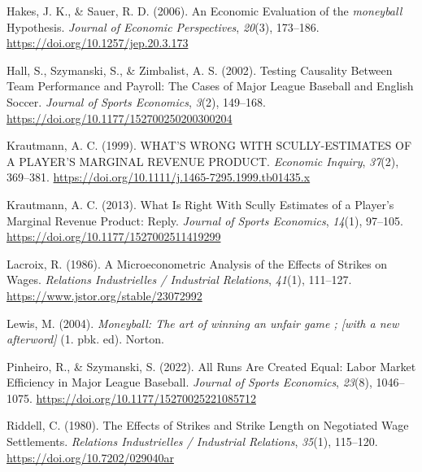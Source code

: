 \documentclass[
  12pt,
  letterpaper,
  DIV=11,
  numbers=noendperiod]{scrartcl}
\newlength{\cslhangindent}
\newlength{\cslentryspacingunit} %
\newenvironment{CSLReferences}[2] %
 {%
  \setlength{\parindent}{0pt}
  \ifodd #1
  \let\oldpar\par
  \def\par{\hangindent=\cslhangindent\oldpar}
  \fi
  \setlength{\parskip}{#2\cslentryspacingunit}
 }%
 {}
\begin{document}
\begin{CSLReferences}{1}{0}
\leavevmode{}%
Hakes, J. K., \& Sauer, R. D. (2006). An {Economic} {Evaluation} of the
\emph{moneyball} {Hypothesis}. \emph{Journal of Economic Perspectives},
\emph{20}(3), 173--186. \url{https://doi.org/10.1257/jep.20.3.173}

\leavevmode{}%
Hall, S., Szymanski, S., \& Zimbalist, A. S. (2002). Testing {Causality}
{Between} {Team} {Performance} and {Payroll}: {The} {Cases} of {Major}
{League} {Baseball} and {English} {Soccer}. \emph{Journal of Sports
Economics}, \emph{3}(2), 149--168.
\url{https://doi.org/10.1177/152700250200300204}

\leavevmode{}%
Krautmann, A. C. (1999). {WHAT}'{S} {WRONG} {WITH} {SCULLY}-{ESTIMATES}
{OF} {A} {PLAYER}'{S} {MARGINAL} {REVENUE} {PRODUCT}. \emph{Economic
Inquiry}, \emph{37}(2), 369--381.
\url{https://doi.org/10.1111/j.1465-7295.1999.tb01435.x}

\leavevmode{}%
Krautmann, A. C. (2013). What {Is} {Right} {With} {Scully} {Estimates}
of a {Player}'s {Marginal} {Revenue} {Product}: {Reply}. \emph{Journal
of Sports Economics}, \emph{14}(1), 97--105.
\url{https://doi.org/10.1177/1527002511419299}

\leavevmode{}%
Lacroix, R. (1986). A {Microeconometric} {Analysis} of the {Effects} of
{Strikes} on {Wages}. \emph{Relations Industrielles / Industrial
Relations}, \emph{41}(1), 111--127.
\url{https://www.jstor.org/stable/23072992}

\leavevmode{}%
Lewis, M. (2004). \emph{Moneyball: The art of winning an unfair game ;
{[}with a new afterword{]}} (1. pbk. ed). Norton.

\leavevmode{}%
Pinheiro, R., \& Szymanski, S. (2022). All {Runs} {Are} {Created}
{Equal}: {Labor} {Market} {Efficiency} in {Major} {League} {Baseball}.
\emph{Journal of Sports Economics}, \emph{23}(8), 1046--1075.
\url{https://doi.org/10.1177/15270025221085712}

\leavevmode{}%
Riddell, C. (1980). The {Effects} of {Strikes} and {Strike} {Length} on
{Negotiated} {Wage} {Settlements}. \emph{Relations Industrielles /
Industrial Relations}, \emph{35}(1), 115--120.
\url{https://doi.org/10.7202/029040ar}


\end{CSLReferences}
\end{document}
